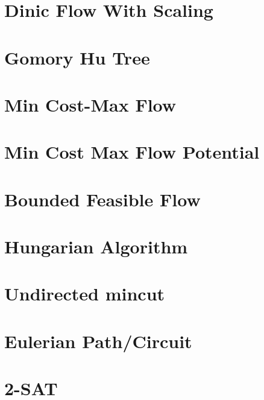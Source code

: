 \section{Dinic Flow With Scaling}
\raggedbottom
\hrulefill

\section{Gomory Hu Tree}
\raggedbottom
\hrulefill

\section{Min Cost-Max Flow}
\raggedbottom
\hrulefill

\section{Min Cost Max Flow Potential}
\raggedbottom
\hrulefill

\section{Bounded Feasible Flow}
\raggedbottom
\hrulefill

\section{Hungarian Algorithm}
\raggedbottom
\hrulefill

\section{Undirected mincut}
\raggedbottom
\hrulefill

\section{Eulerian Path/Circuit}
\raggedbottom
\hrulefill

\section{2-SAT}
\raggedbottom
\hrulefill

